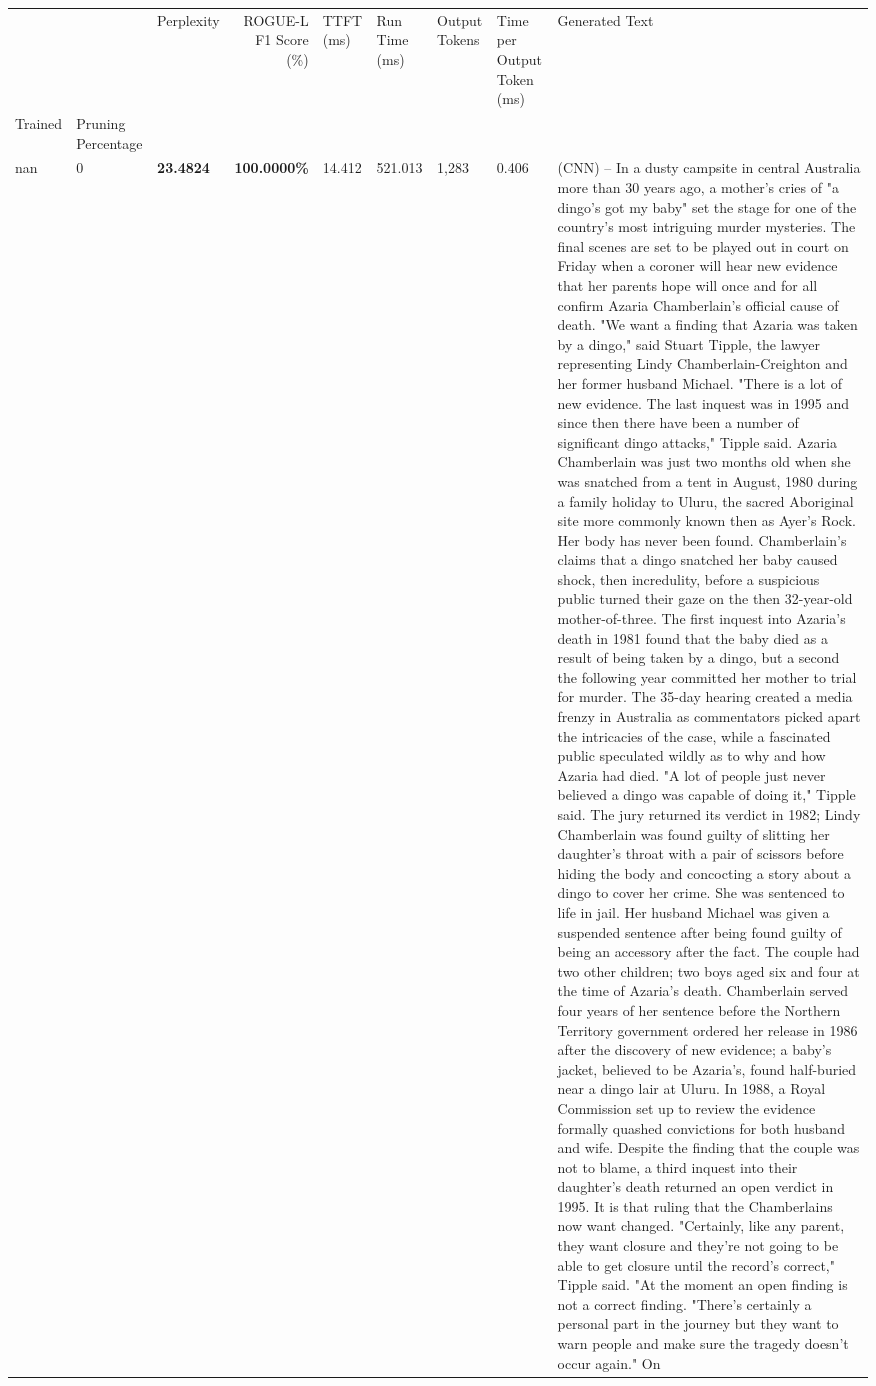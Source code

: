 \begin{table}[H]
\begin{tabular}{lllrlllll}
\toprule
 &  & Perplexity & ROGUE-L F1 Score (\%) & TTFT (ms) & Run Time (ms) & Output Tokens & Time per Output Token (ms) & Generated Text \\
Trained & Pruning Percentage &  &  &  &  &  &  &  \\
\midrule
nan & 0 & \bfseries 23.4824 & \bfseries 100.0000\% & 14.412 & 521.013 & 1,283 & 0.406 & (CNN) -- In a dusty campsite in central Australia more than 30 years ago, a mother's cries of "a dingo's got my baby" set the stage for one of the country's most intriguing murder mysteries. The final scenes are set to be played out in court on Friday when a coroner will hear new evidence that her parents hope will once and for all confirm Azaria Chamberlain's official cause of death. "We want a finding that Azaria was taken by a dingo," said Stuart Tipple, the lawyer representing Lindy Chamberlain-Creighton and her former husband Michael. "There is a lot of new evidence. The last inquest was in 1995 and since then there have been a number of significant dingo attacks," Tipple said. Azaria Chamberlain was just two months old when she was snatched from a tent in August, 1980 during a family holiday to Uluru, the sacred Aboriginal site more commonly known then as Ayer's Rock. Her body has never been found. Chamberlain's claims that a dingo snatched her baby caused shock, then incredulity, before a suspicious public turned their gaze on the then 32-year-old mother-of-three. The first inquest into Azaria's death in 1981 found that the baby died as a result of being taken by a dingo, but a second the following year committed her mother to trial for murder. The 35-day hearing created a media frenzy in Australia as commentators picked apart the intricacies of the case, while a fascinated public speculated wildly as to why and how Azaria had died. "A lot of people just never believed a dingo was capable of doing it," Tipple said. The jury returned its verdict in 1982; Lindy Chamberlain was found guilty of slitting her daughter's throat with a pair of scissors before hiding the body and concocting a story about a dingo to cover her crime. She was sentenced to life in jail. Her husband Michael was given a suspended sentence after being found guilty of being an accessory after the fact. The couple had two other children; two boys aged six and four at the time of Azaria's death. Chamberlain served four years of her sentence before the Northern Territory government ordered her release in 1986 after the discovery of new evidence; a baby's jacket, believed to be Azaria's, found half-buried near a dingo lair at Uluru. In 1988, a Royal Commission set up to review the evidence formally quashed convictions for both husband and wife. Despite the finding that the couple was not to blame, a third inquest into their daughter's death returned an open verdict in 1995. It is that ruling that the Chamberlains now want changed. "Certainly, like any parent, they want closure and they're not going to be able to get closure until the record's correct," Tipple said. "At the moment an open finding is not a correct finding. "There's certainly a personal part in the journey but they want to warn people and make sure the tragedy doesn't occur again." On 
\end{tabular}
\end{table}
